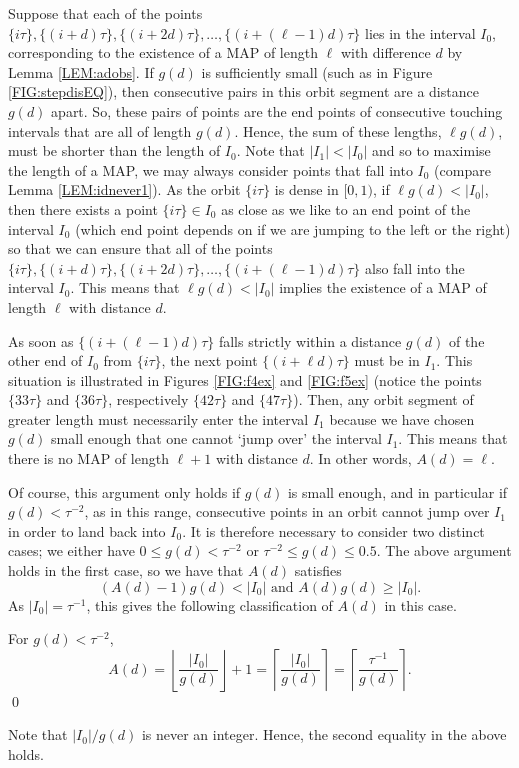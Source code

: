 \documentclass[10pt,a4paper,reqno]{amsart}
\begin{document}
Suppose that each of the points $\{ i\tau\}, \{ (i+d)\tau\}, \{ (i+2d)\tau\}, \ldots, \{ (i+(\ell-1) d)\tau\}$ lies in the interval $I_0$, corresponding to the existence of a MAP of length $\ell$ with difference $d$ by Lemma \ref{LEM:adobs}.
If $g(d)$ is sufficiently small (such as in Figure \ref{FIG:stepdisEQ}), then consecutive pairs in this orbit segment are a distance $g(d)$ apart. So, these pairs of points are the end points of consecutive touching intervals that are all of length $g(d)$. Hence, the sum of these lengths, $\ell g(d)$, must be shorter than the length of $I_0$.
Note that $|I_1|<|I_0|$ and so to maximise the length of a MAP, we may always consider points that fall into $I_0$ (compare Lemma \ref{LEM:idnever1}). As the orbit $\{ i\tau \}$ is dense in $[0,1)$, if $\ell g(d) < |I_0|$, then there exists a point $\{ i \tau\} \in I_0$ as close as we like to an end point of the interval $I_0$ (which end point depends on if we are jumping to the left or the right) so that we can ensure that all of the points $\{ i\tau\}, \{ (i+d)\tau\}, \{ (i+2d)\tau\}, \ldots, \{ (i+(\ell-1) d)\tau\}$ also fall into the interval $I_0$. This means that $\ell g(d) <|I_0|$ implies the existence of a MAP of length $\ell$ with distance $d$.

As soon as $\{ (i+(\ell-1) d)\tau\}$ falls strictly within a distance $g(d)$ of the other end of $I_0$ from $\{i\tau\}$, the next point $\{ (i+\ell d)\tau\}$ must be in $I_1$. This situation is illustrated in Figures \ref{FIG:f4ex} and \ref{FIG:f5ex} (notice the points $\{ 33\tau\}$ and $\{ 36\tau\}$, respectively $\{ 42\tau\}$ and $\{ 47\tau\}$). Then, any orbit segment of greater length must necessarily enter the interval $I_1$ because we have chosen $g(d)$ small enough that one cannot `jump over' the interval $I_1$. This means that there is no MAP of length $\ell+1$ with distance $d$. In other words, $A(d) = \ell$.

Of course, this argument only holds if $g(d)$ is small enough, and in particular if $g(d)<\tau^{-2}$, as in this range, consecutive points in an orbit cannot jump over $I_1$ in order to land back into $I_0$. It is therefore necessary to consider two distinct cases; we either have $0\leq g(d)< \tau^{-2}$ or $\tau^{-2}\leq g(d)\leq 0.5$. The above argument holds in the first case, so we have that $A(d)$ satisfies
\[
(A(d)-1) g(d) < |I_0|\text{ and }A(d)g(d) \geq |I_0|.
\]
As $|I_0| = \tau^{-1}$, this gives the following classification of $A(d)$ in this case.
\begin{theorem}\label{THM:adformula}
    For $g(d)< \tau^{-2}$, \[A(d) = \left\lfloor\frac{|I_0|}{g(d)}\right\rfloor + 1 = \left\lceil\frac{|I_0|}{g(d)}\right\rceil = \left\lceil\frac{\tau^{-1}}{g(d)}\right\rceil.\]\hfill\qed
\end{theorem}
Note that $|I_0|/g(d)$ is never an integer. Hence, the second equality in the above holds.
\end{document}
